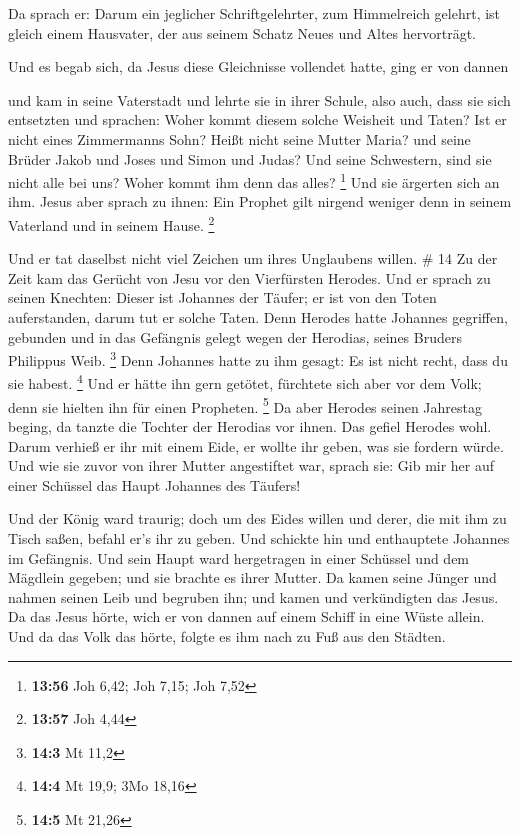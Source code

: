  Da sprach er: Darum ein jeglicher Schriftgelehrter, zum
Himmelreich gelehrt, ist gleich einem Hausvater, der aus seinem Schatz
Neues und Altes hervorträgt.

 Und es begab sich, da Jesus diese Gleichnisse vollendet
hatte, ging er von dannen

 und kam in seine Vaterstadt und lehrte sie in ihrer
Schule, also auch, dass sie sich entsetzten und sprachen: Woher kommt
diesem solche Weisheit und Taten?  Ist er nicht eines
Zimmermanns Sohn? Heißt nicht seine Mutter Maria? und seine Brüder Jakob
und Joses und Simon und Judas?  Und seine Schwestern,
sind sie nicht alle bei uns? Woher kommt ihm denn das alles? \footnote{\textbf{13:56}
  Joh 6,42; Joh 7,15; Joh 7,52}  Und sie ärgerten sich an
ihm. Jesus aber sprach zu ihnen: Ein Prophet gilt nirgend weniger denn
in seinem Vaterland und in seinem Hause. \footnote{\textbf{13:57} Joh
  4,44}

 Und er tat daselbst nicht viel Zeichen um ihres
Unglaubens willen. \# 14  Zu der Zeit kam das Gerücht von
Jesu vor den Vierfürsten Herodes.  Und er sprach zu seinen
Knechten: Dieser ist Johannes der Täufer; er ist von den Toten
auferstanden, darum tut er solche Taten.  Denn Herodes
hatte Johannes gegriffen, gebunden und in das Gefängnis gelegt wegen der
Herodias, seines Bruders Philippus Weib. \footnote{\textbf{14:3} Mt 11,2}
 Denn Johannes hatte zu ihm gesagt: Es ist nicht recht,
dass du sie habest. \footnote{\textbf{14:4} Mt 19,9; 3Mo 18,16}
 Und er hätte ihn gern getötet, fürchtete sich aber vor
dem Volk; denn sie hielten ihn für einen Propheten. \footnote{\textbf{14:5}
  Mt 21,26}  Da aber Herodes seinen Jahrestag beging, da
tanzte die Tochter der Herodias vor ihnen. Das gefiel Herodes wohl.
 Darum verhieß er ihr mit einem Eide, er wollte ihr geben,
was sie fordern würde.  Und wie sie zuvor von ihrer Mutter
angestiftet war, sprach sie: Gib mir her auf einer Schüssel das Haupt
Johannes des Täufers!

 Und der König ward traurig; doch um des Eides willen und
derer, die mit ihm zu Tisch saßen, befahl er's ihr zu geben.
 Und schickte hin und enthauptete Johannes im Gefängnis.
 Und sein Haupt ward hergetragen in einer Schüssel und
dem Mägdlein gegeben; und sie brachte es ihrer Mutter. 
Da kamen seine Jünger und nahmen seinen Leib und begruben ihn; und kamen
und verkündigten das Jesus.  Da das Jesus hörte, wich er
von dannen auf einem Schiff in eine Wüste allein. Und da das Volk das
hörte, folgte es ihm nach zu Fuß aus den Städten.

